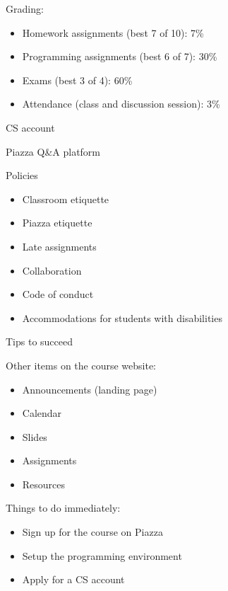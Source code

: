 \documentclass[8pt,a4paper,compress,handout]{beamer}
\begin{document}
\begin{frame}[fragile]
\pause
Grading:
\begin{itemize}
\item Homework assignments (best 7 of 10): 7\%
\item Programming assignments (best 6 of 7): 30\%
\item Exams (best 3 of 4): 60\%
\item Attendance (class and discussion session): 3\%
\end{itemize}

\pause
\bigskip

CS account

\pause
\bigskip

Piazza Q\&A platform

\pause
\bigskip

Policies
\begin{itemize}
\item Classroom etiquette
\item Piazza etiquette
\item Late assignments
\item Collaboration
\item Code of conduct
\item Accommodations for students with disabilities
\end{itemize}
\end{frame}

\begin{frame}[fragile]
\pause
Tips to succeed

\pause
\bigskip

Other items on the course website:
\begin{itemize}
\item Announcements (landing page)
\item Calendar
\item Slides 
\item Assignments
\item Resources
\end{itemize}

\pause
\bigskip

Things to do immediately:
\begin{itemize}
\item Sign up for the course on Piazza
\item Setup the programming environment
\item Apply for a CS account
\end{itemize}
\end{frame}
\end{document}
